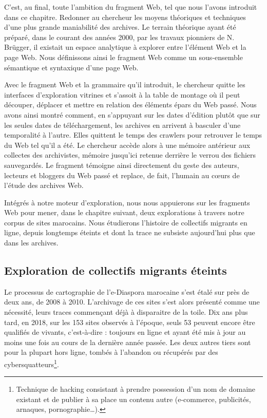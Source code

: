 \documentclass[symmetric,justified,marginals=raggedouter]{tufte-book}
\begin{document}
C'est, au final, toute l'ambition du fragment Web, tel que nous l'avons introduit dans ce chapitre. Redonner au chercheur les moyens théoriques et techniques d'une plus grande maniabilité des archives. Le terrain théorique ayant été préparé, dans le courant des années 2000, par les travaux pionniers de N. Brügger, il existait un espace analytique à explorer entre l'élément Web et la page Web. Nous définissons ainsi le fragment Web comme un sous-ensemble sémantique et syntaxique d'une page Web.

Avec le fragment Web et la grammaire qu'il introduit, le chercheur quitte les interfaces d'exploration vitrines et s'assoit à la table de montage où il peut découper, déplacer et mettre en relation des éléments épars du Web passé. Nous avons ainsi montré comment, en s'appuyant sur les dates d'édition plutôt que sur les seules dates de téléchargement, les archives en arrivent à basculer d'une temporalité à l'autre. Elles quittent le temps des crawlers pour retrouver le temps du Web tel qu'il a été. Le chercheur accède alors à une mémoire antérieur aux collectes des archivistes, mémoire jusqu'ici retenue derrière le verrou des fichiers sauvegardés. Le fragment témoigne ainsi directement du geste des auteurs, lecteurs et bloggers du Web passé et replace, de fait, l'humain au cœurs de l'étude des archives Web.

Intégrés à notre moteur d'exploration, nous nous appuierons sur les fragments Web pour mener, dans le chapitre suivant, deux explorations à travers notre corpus de sites marocains. Nous étudierons l'histoire de collectifs migrants en ligne, depuis longtemps éteints et dont la trace ne subsiste aujourd'hui plus que dans les archives.  



\cleardoublepage
\begin{minipage}[t,leftmargin=5em]{1.5\linewidth}%
\begin{adjustwidth}{-0.5cm}{}
\chapter{Exploration de collectifs migrants éteints} 
\label{chap:6}
\end{adjustwidth}
\end{minipage}
\hfill

\noindent Le processus de cartographie de l'e-Diaspora marocaine s'est étalé sur près de deux ans, de 2008 à 2010. L'archivage de ces sites s'est alors présenté comme une nécessité, leurs traces commençant déjà à disparaitre de la toile. Dix ans plus tard, en 2018, sur les 153 sites observés à l'époque, seuls 53 peuvent encore être qualifiés de vivants, c'est-à-dire : toujours en ligne et ayant été mis à jour au moins une fois au cours de la dernière année passée. Les deux autres tiers sont pour la plupart hors ligne, tombés à l'abandon ou récupérés par des cybersquatteurs\footnote{\RaggedOuter Technique de hacking consistant à prendre possession d'un nom de domaine existant et de publier à sa place un contenu autre (e-commerce, publicités, arnaques, pornographie\ldots{}).}.      
\end{document}
